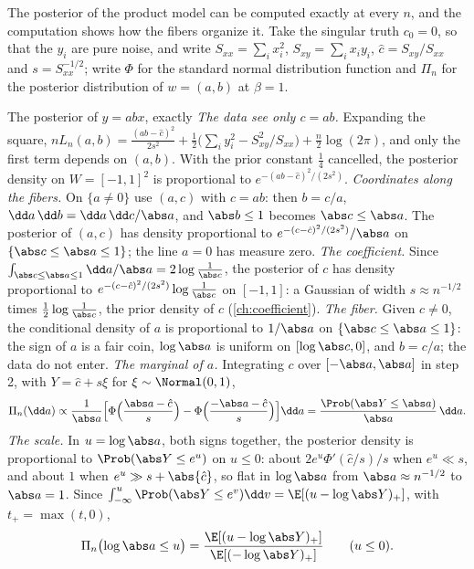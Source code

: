 \begin{refsection}
The posterior of the product model can be computed exactly at every $n$, and the computation shows how the fibers organize it. Take the singular truth $c_0=0$, so that the $y_i$ are pure noise, and write $S_{xx}=\sum_ix_i^2$, $S_{xy}=\sum_ix_iy_i$, $\hat c=S_{xy}/S_{xx}$ and $s=S_{xx}^{-1/2}$; write $\Phi$ for the standard normal distribution function and $\Pi_n$ for the posterior distribution of $w=(a,b)$ at $\beta=1$.

\begin{computation}{The posterior of $y=abx$, exactly}\label{comp:singular:posterior}
\step \emph{The data see only $c=ab$.} Expanding the square, $nL_n(a,b)=\frac{(ab-\hat c)^2}{2s^2}+\frac12\bigl(\sum_iy_i^2-S_{xy}^2/S_{xx}\bigr)+\frac n2\log(2\pi)$, and only the first term depends on $(a,b)$. With the prior constant $\frac14$ cancelled, the posterior density on $W=[-1,1]^2$ is proportional to $e^{-(ab-\hat c)^2/(2s^2)}$.
\step \emph{Coordinates along the fibers.} On $\{a\ne0\}$ use $(a,c)$ with $c=ab$: then $b=c/a$, $\dd a\,\dd b=\dd a\,\dd c/\abs a$, and $\abs b\le1$ becomes $\abs c\le\abs a$. The posterior of $(a,c)$ has density proportional to $e^{-(c-\hat c)^2/(2s^2)}/\abs a$ on $\{\abs c\le\abs a\le1\}$; the line $a=0$ has measure zero.
\step \emph{The coefficient.} Since $\int_{\abs c\le\abs a\le1}\dd a/\abs a=2\log\frac1{\abs c}$, the posterior of $c$ has density proportional to $e^{-(c-\hat c)^2/(2s^2)}\log\frac1{\abs c}$ on $[-1,1]$: a Gaussian of width $s\approx n^{-1/2}$ times $\frac12\log\frac1{\abs c}$, the prior density of $c$ (\cref{ch:coefficient}).
\step \emph{The fiber.} Given $c\ne0$, the conditional density of $a$ is proportional to $1/\abs a$ on $\{\abs c\le\abs a\le1\}$: the sign of $a$ is a fair coin, $\log\abs a$ is uniform on $[\log\abs c,0]$, and $b=c/a$; the data do not enter.
\step \emph{The marginal of $a$.} Integrating $c$ over $[-\abs a,\abs a]$ in step 2, with $Y=\hat c+s\xi$ for $\xi\sim\Normal(0,1)$,
\[
\Pi_n(\dd a)\propto\frac1{\abs a}\Bigl[\Phi\Bigl(\frac{\abs a-\hat c}s\Bigr)-\Phi\Bigl(\frac{-\abs a-\hat c}s\Bigr)\Bigr]\dd a=\frac{\Prob(\abs Y\le\abs a)}{\abs a}\,\dd a.
\]
\step \emph{The scale.} In $u=\log\abs a$, both signs together, the posterior density is proportional to $\Prob(\abs Y\le e^u)$ on $u\le0$: about $2e^u\Phi'(\hat c/s)/s$ when $e^u\ll s$, and about $1$ when $e^u\gg s+\abs{\hat c}$, so flat in $\log\abs a$ from $\abs a\approx n^{-1/2}$ to $\abs a=1$. Since $\int_{-\infty}^u\Prob(\abs Y\le e^v)\dd v=\E[(u-\log\abs Y)_+]$, with $t_+=\max(t,0)$,
\[
\Pi_n\bigl(\log\abs a\le u\bigr)=\frac{\E[(u-\log\abs Y)_+]}{\E[(-\log\abs Y)_+]}\qquad(u\le0).
\]
\end{computation}


\end{refsection}
